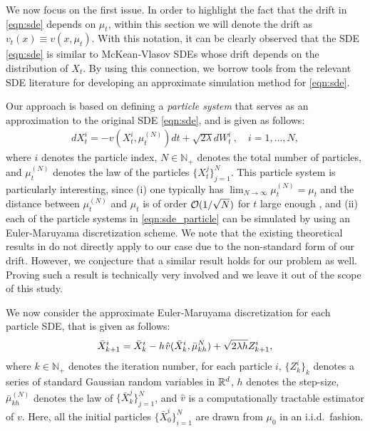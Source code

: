 We now focus on the first issue. In order to highlight the fact that the drift in \eqref{eqn:sde} depends on $\mu_t$, within this section we will denote the drift as $v_t(x) \equiv v(x, \mu_t)$. With this notation, it can be clearly observed that the SDE \eqref{eqn:sde} is similar to McKean-Vlasov SDEs \cite{veretennikov2006ergodic,mishura2016existence} whose drift depends on the distribution of $X_t$. By using this connection, we borrow tools from the relevant SDE literature \cite{malrieu03,cgm-08} for developing an approximate simulation method for \eqref{eqn:sde}. 

Our approach is based on defining a \emph{particle system} that serves as an approximation to the original SDE \eqref{eqn:sde}, and is given as follows:
\begin{align}
d X_t^i = - v(X_t^i, \mu_t^{(N)}) dt + \sqrt{2 \lambda } d W_t^i \> , \quad i = 1,\dots, N, \label{eqn:sde_particle}
\end{align}
where $i$ denotes the particle index, $N \in \mathbb{N}_+$ denotes the total number of particles, and $\mu_t^{(N)}$ denotes the law of the particles $\{X_t^j\}_{j=1}^N$. This particle system is particularly interesting, since (i) one typically has $\lim_{N \rightarrow \infty} \mu_t^{(N)}= \mu_t $ and the distance between $\mu_t^{(N)}$ and $\mu_t$ is of order ${\cal O}(1/\sqrt{N})$ for $t$ large enough \cite{malrieu03,cgm-08}, and (ii) each of the particle systems in \eqref{eqn:sde_particle} can be simulated by using an Euler-Maruyama discretization scheme. We note that the existing theoretical results in \cite{veretennikov2006ergodic,mishura2016existence} do not directly apply to our case due to the non-standard form of our drift. However, we conjecture that a similar result holds for our problem as well. Proving such a result is technically very involved and we leave it out of the scope of this study. %

We now consider the approximate Euler-Maruyama discretization for each particle SDE, that is given as follows:
\begin{align}
\bar{X}^i_{k+1} = \bar{X}^i_k - h \hspace{0.5pt} \hat{v}(\bar{X}^i_k, \bar{\mu}_{kh}^N ) + \sqrt{2 \lambda h} Z^i_{k+1},
\end{align}
where $k \in \mathbb{N}_+$ denotes the iteration number, for each particle $i$, $\{Z^i_k\}_{k}$ denotes a series of standard Gaussian random variables in $\mathbb{R}^d$, $h$ denotes the step-size, $\bar{\mu}_{kh}^{(N)}$ denotes the law of $\{\bar{X}_{k}^j\}_{j=1}^N$, and $\hat{v}$ is a computationally tractable estimator of $v$. Here, all the initial particles $\{\bar{X}_0^i\}_{i=1}^N$ are drawn from $\mu_0$ in an i.i.d.\ fashion.

